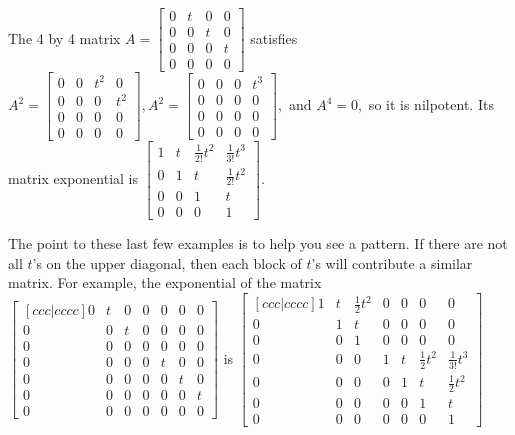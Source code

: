 The 4 by 4 matrix $A=
\begin{bmatrix}
 0 & t & 0 & 0 \\
 0 & 0 & t & 0 \\
 0 & 0 & 0 & t \\
 0 & 0 & 0 & 0
\end{bmatrix}
$ satisfies
$A^2 = 
\begin{bmatrix}
 0 & 0 & t^2 & 0 \\
 0 & 0 & 0 & t^2 \\
 0 & 0 & 0 & 0 \\
 0 & 0 & 0 & 0
\end{bmatrix}
,
A^2 = 
\begin{bmatrix}
 0 & 0 & 0 & t^3 \\
 0 & 0 & 0 & 0 \\
 0 & 0 & 0 & 0 \\
 0 & 0 & 0 & 0
\end{bmatrix}
,$ and
$A^4 = 0,$ so it is nilpotent. Its matrix exponential is
$
\begin{bmatrix}
 1 & t & \frac{1}{2!}t^2 & \frac{1}{3!}t^3 \\
 0 & 1 & t & \frac{1}{2!}t^2 \\
 0 & 0 & 1 & t \\
 0 & 0 & 0 & 1
\end{bmatrix}
$. 

The point to these last few examples is to help you see a pattern. If there are not all $t$'s on the upper diagonal, then each block of $t$'s will contribute a similar matrix.  For example, the exponential of the matrix 
$
\begin{bmatrix}[ccc|cccc]
 0 & t & 0 & 0 & 0 & 0 & 0 \\
 0 & 0 & t & 0 & 0 & 0 & 0 \\
 0 & 0 & 0 & 0 & 0 & 0 & 0 \\\hline
 0 & 0 & 0 & 0 & t & 0 & 0 \\
 0 & 0 & 0 & 0 & 0 & t & 0 \\
 0 & 0 & 0 & 0 & 0 & 0 & t \\
 0 & 0 & 0 & 0 & 0 & 0 & 0
\end{bmatrix}
$ is
$
\begin{bmatrix}[ccc|cccc]
 1 & t & \frac{1}{2}t^2 & 0 & 0 & 0 & 0 \\
 0 & 1 & t & 0 & 0 & 0 & 0 \\
 0 & 0 & 1 & 0 & 0 & 0 & 0 \\\hline
 0 & 0 & 0 & 1 & t & \frac{1}{2}t^2 & \frac{1}{3!}t^3 \\
 0 & 0 & 0 & 0 & 1 & t & \frac{1}{2}t^2 \\
 0 & 0 & 0 & 0 & 0 & 1 & t \\
 0 & 0 & 0 & 0 & 0 & 0 & 1
\end{bmatrix}
$

